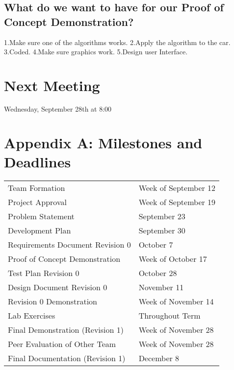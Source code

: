 \documentclass[11pt]{meetingmins}
\begin{document}
		
	\subsection{What do we want to have for our Proof of Concept Demonstration?}
		1.Make sure one of the algorithms works.
		2.Apply the algorithm to the car.
		3.Coded.
		4.Make sure graphics work.
		5.Design user Interface.

		
\section{Next Meeting}
	Wednesday, September 28th at 8:00
	\vspace{1em}

\newpage
\section{Appendix A: Milestones and Deadlines}
\begin{tabular}{ p{6.7cm} l}

  Team Formation & Week of September 12\\

  Project Approval & Week of September 19\\

  Problem Statement & September 23\\

  Development Plan & September 30\\

  Requirements Document Revision 0 & October 7\\

  Proof of Concept Demonstration & Week of October 17\\

  Test Plan Revision 0 & October 28\\

  Design Document Revision 0 & November 11\\

  Revision 0 Demonstration & Week of November 14\\

  Lab Exercises & Throughout Term\\

  Final Demonstration (Revision 1) & Week of November 28\\

  Peer Evaluation of Other Team & Week of November 28\\

  Final Documentation (Revision 1) & December 8\\

\end{tabular}
\end{document}
